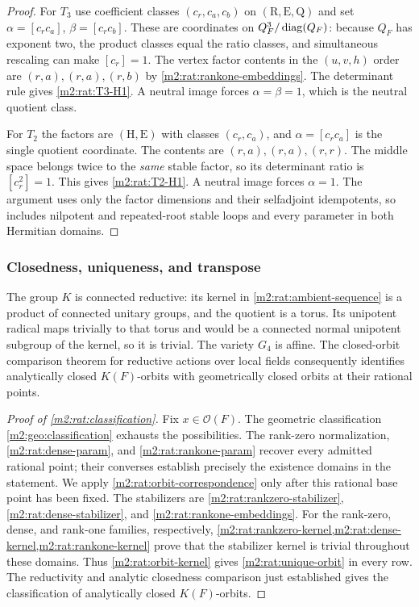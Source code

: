 \begin{proof}
For $T_3$ use coefficient classes $(c_r,c_a,c_b)$ on
$(\mathrm R,\mathrm E,\mathrm Q)$ and set
$\alpha=[c_rc_a]$, $\beta=[c_rc_b]$. These are coordinates
on $Q_F^3/\operatorname{diag}(Q_F)$: because $Q_F$ has exponent two,
the product classes equal the ratio classes, and simultaneous
rescaling can make $[c_r]=1$. The vertex factor contents in
the $(u,v,h)$ order are $(r,a),(r,a),(r,b)$ by
\eqref{m2:rat:rankone-embeddings}. The determinant rule gives
\eqref{m2:rat:T3-H1}. A neutral image forces
$\alpha=\beta=1$, which is the neutral quotient class.

For $T_2$ the factors are $(\mathrm H,\mathrm E)$ with
classes $(c_r,c_a)$, and $\alpha=[c_rc_a]$ is the single
quotient coordinate. The contents are $(r,a),(r,a),(r,r)$.
The middle space belongs twice to the \emph{same} stable
factor, so its determinant ratio is $[c_r^2]=1$. This gives
\eqref{m2:rat:T2-H1}. A neutral image forces $\alpha=1$.
The argument uses only the factor dimensions and their
selfadjoint idempotents, so includes nilpotent and repeated-root
stable loops and every parameter in both Hermitian domains.
\end{proof}

\subsubsection{Closedness, uniqueness, and transpose}

The group $K$ is connected reductive: its kernel in
\eqref{m2:rat:ambient-sequence} is a product of connected
unitary groups, and the quotient is a torus.  Its
unipotent radical maps trivially to that torus and would
be a connected normal unipotent subgroup of the kernel,
so it is trivial.  The variety $G_4$ is affine.
The closed-orbit comparison theorem for reductive
actions over local fields
\cite[Theorem~2.3.8]{AGDescent} consequently identifies
analytically closed $K(F)$-orbits with geometrically
closed orbits at their rational points.

\begin{proof}[Proof of \cref{m2:rat:classification}]
Fix $x\in\mathscr O(F)$. The geometric classification
\cref{m2:geo:classification} exhausts the possibilities. The
rank-zero normalization, \cref{m2:rat:dense-param}, and
\cref{m2:rat:rankone-param} recover every admitted rational point;
their converses establish precisely the existence domains in
the statement. We apply \cref{m2:rat:orbit-correspondence} only
after this rational base point has been fixed. The stabilizers
are \eqref{m2:rat:rankzero-stabilizer},
\eqref{m2:rat:dense-stabilizer}, and
\eqref{m2:rat:rankone-embeddings}.
For the rank-zero, dense, and rank-one families, respectively,
\cref{m2:rat:rankzero-kernel,m2:rat:dense-kernel,m2:rat:rankone-kernel}
prove that the stabilizer kernel is trivial throughout these
domains. Thus \eqref{m2:rat:orbit-kernel} gives
\eqref{m2:rat:unique-orbit} in every row. The reductivity and
analytic closedness comparison just established gives the classification
of analytically closed $K(F)$-orbits.
\end{proof}


